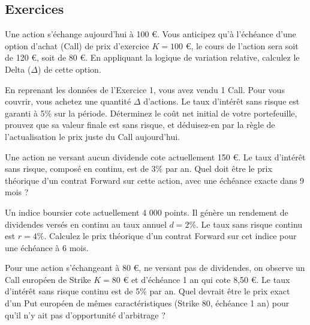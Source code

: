 \subsection{Exercices}

\begin{exercicebox}
Une action s'échange aujourd'hui à 100 €. Vous anticipez qu'à l'échéance d'une option d'achat (Call) de prix d'exercice $K = 100$ €, le cours de l'action sera soit de 120 €, soit de 80 €.
En appliquant la logique de variation relative, calculez le Delta ($\Delta$) de cette option.
\end{exercicebox}

\begin{exercicebox}
En reprenant les données de l'Exercice 1, vous avez vendu 1 Call. Pour vous couvrir, vous achetez une quantité $\Delta$ d'actions. Le taux d'intérêt sans risque est garanti à 5\% sur la période.
Déterminez le coût net initial de votre portefeuille, prouvez que sa valeur finale est sans risque, et déduisez-en par la règle de l'actualisation le prix juste du Call aujourd'hui.
\end{exercicebox}

\begin{exercicebox}
Une action ne versant aucun dividende cote actuellement 150 €. Le taux d'intérêt sans risque, composé en continu, est de 3\% par an.
Quel doit être le prix théorique d'un contrat Forward sur cette action, avec une échéance exacte dans 9 mois ?
\end{exercicebox}

\begin{exercicebox}
Un indice boursier cote actuellement 4 000 points. Il génère un rendement de dividendes versés en continu au taux annuel $d = 2\%$. Le taux sans risque continu est $r = 4\%$.
Calculez le prix théorique d'un contrat Forward sur cet indice pour une échéance à 6 mois.
\end{exercicebox}

\begin{exercicebox}
Pour une action s'échangeant à 80 €, ne versant pas de dividendes, on observe un Call européen de Strike $K = 80$ € et d'échéance 1 an qui cote 8,50 €. Le taux d'intérêt sans risque continu est de 5\% par an.
Quel devrait être le prix exact d'un Put européen de mêmes caractéristiques (Strike 80, échéance 1 an) pour qu'il n'y ait pas d'opportunité d'arbitrage ?
\end{exercicebox}

